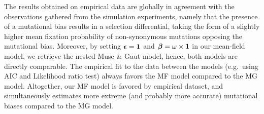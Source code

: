 \documentclass{article}
\begin{document}
The results obtained on empirical data are globally in agreement with the observations gathered from the simulation experiments, namely that the presence of a mutational bias results in a selection differential, taking the form of a slightly higher mean fixation probability of {non-synonymous} mutations opposing the mutational bias.
Moreover, by setting $\bm{\epsilon} = \bm{1}$ and $\bm{\beta} = \omega \times \bm{1}$ in our mean-field model, we retrieve the nested Muse \& Gaut model, hence, both models are directly comparable.
The empirical fit to the data between the models (e.g.~using AIC and Likelihood ratio test) always favors the MF model compared to the MG model.
Altogether, our {MF} model is favored by empirical dataset, and simultaneously estimates more extreme (and probably more accurate) mutational biases compared to the {MG} model.
\end{document}
